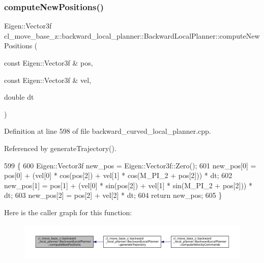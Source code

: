 \subsubsection{\texorpdfstring{compute\+New\+Positions()}{computeNewPositions()}}
{\footnotesize\ttfamily Eigen\+::\+Vector3f cl\+\_\+move\+\_\+base\+\_\+z\+::backward\+\_\+local\+\_\+planner\+::\+Backward\+Local\+Planner\+::compute\+New\+Positions (\begin{DoxyParamCaption}\item[{const Eigen\+::\+Vector3f \&}]{pos,  }\item[{const Eigen\+::\+Vector3f \&}]{vel,  }\item[{double}]{dt }\end{DoxyParamCaption})\hspace{0.3cm}{\ttfamily [private]}}



Definition at line 598 of file backward\+\_\+curved\+\_\+local\+\_\+planner.\+cpp.



Referenced by generate\+Trajectory().


\begin{DoxyCode}
599         \{
600             Eigen::Vector3f new\_pos = Eigen::Vector3f::Zero();
601             new\_pos[0] = pos[0] + (vel[0] * cos(pos[2]) + vel[1] * cos(M\_PI\_2 + pos[2])) * dt;
602             new\_pos[1] = pos[1] + (vel[0] * sin(pos[2]) + vel[1] * sin(M\_PI\_2 + pos[2])) * dt;
603             new\_pos[2] = pos[2] + vel[2] * dt;
604             \textcolor{keywordflow}{return} new\_pos;
605         \}
\end{DoxyCode}
Here is the caller graph for this function\+:
\nopagebreak
\begin{figure}[H]
\begin{center}
\leavevmode
\includegraphics[width=350pt]{classcl__move__base__z_1_1backward__local__planner_1_1BackwardLocalPlanner_a0fe2ebd23fd79e8b574127e819ef0e14_icgraph}
\end{center}
\end{figure}
\mbox{\label{classcl__move__base__z_1_1backward__local__planner_1_1BackwardLocalPlanner_a25437208766366ca22f967fe72e80988}} 
